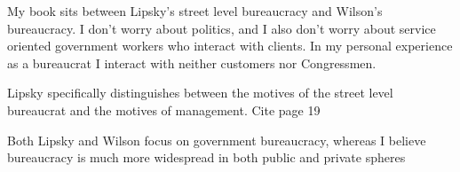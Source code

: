 My book sits between Lipsky's street level bureaucracy and Wilson's bureaucracy. 
I don't worry about politics, and I also don't worry about service oriented government workers who interact with clients.
In my personal experience as a bureaucrat I interact with neither customers nor Congressmen. 

Lipsky specifically distinguishes between the motives of the street level bureaucrat and the motives of management. Cite page 19

Both Lipsky and Wilson focus on government bureaucracy, whereas I believe bureaucracy is much more widespread in both public and private spheres
